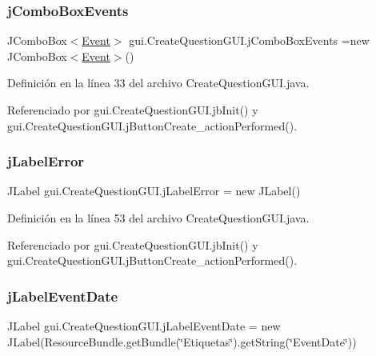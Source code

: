 \subsubsection{\texorpdfstring{jComboBoxEvents}{jComboBoxEvents}}
{\footnotesize\ttfamily J\+Combo\+Box$<$\mbox{\hyperlink{classdomain_1_1Event}{Event}}$>$ gui.\+Create\+Question\+G\+U\+I.\+j\+Combo\+Box\+Events =new J\+Combo\+Box$<$\mbox{\hyperlink{classdomain_1_1Event}{Event}}$>$()\hspace{0.3cm}{\ttfamily [private]}}



Definición en la línea 33 del archivo Create\+Question\+G\+U\+I.\+java.



Referenciado por gui.\+Create\+Question\+G\+U\+I.\+jb\+Init() y gui.\+Create\+Question\+G\+U\+I.\+j\+Button\+Create\+\_\+action\+Performed().

\mbox{\label{classgui_1_1CreateQuestionGUI_a1cb82bebfab8f827f7ef9cc7f62db11d}} 
\subsubsection{\texorpdfstring{jLabelError}{jLabelError}}
{\footnotesize\ttfamily J\+Label gui.\+Create\+Question\+G\+U\+I.\+j\+Label\+Error = new J\+Label()\hspace{0.3cm}{\ttfamily [private]}}



Definición en la línea 53 del archivo Create\+Question\+G\+U\+I.\+java.



Referenciado por gui.\+Create\+Question\+G\+U\+I.\+jb\+Init() y gui.\+Create\+Question\+G\+U\+I.\+j\+Button\+Create\+\_\+action\+Performed().

\mbox{\label{classgui_1_1CreateQuestionGUI_a5451d834c1a494fdb7b7dc2bb3499ecf}} 
\subsubsection{\texorpdfstring{jLabelEventDate}{jLabelEventDate}}
{\footnotesize\ttfamily J\+Label gui.\+Create\+Question\+G\+U\+I.\+j\+Label\+Event\+Date = new J\+Label(Resource\+Bundle.\+get\+Bundle(\char`\"{}Etiquetas\char`\"{}).get\+String(\char`\"{}Event\+Date\char`\"{}))\hspace{0.3cm}{\ttfamily [private]}}



